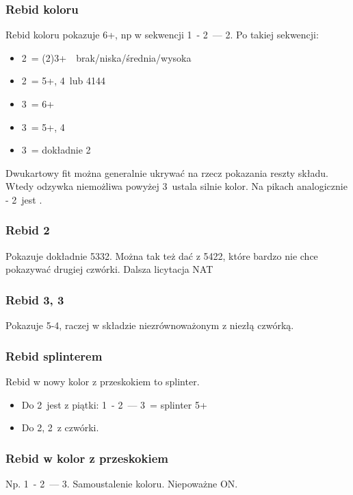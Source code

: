 \documentclass[12pt, a4paper]{article}
\begin{document}
\subsubsection*{Rebid koloru}
    Rebid koloru pokazuje 6+, np w sekwencji 1\hearts\ - 2\clubs\ --- 2\hearts.
    Po takiej sekwencji:
    \begin{itemize}
        \item 2\spades\ = (2)3+\hearts\ \lsf\ brak/niska/średnia/wysoka
        \item 2\nt\ = 5+\clubs, 4\spades\ lub 4144
        \item 3\clubs\ = 6+\clubs
        \item 3\diams\ = 5+\clubs, 4\diams
        \item 3\hearts\ = dokładnie 2\hearts\
    \end{itemize}
    Dwukartowy fit można generalnie ukrywać na rzecz pokazania reszty składu. Wtedy odzywka niemożliwa powyżej
    3\nt\ ustala silnie kolor.
    Na pikach analogicznie - 2\nt\ jest \lsf.

\subsubsection*{Rebid 2\ntx}
    Pokazuje dokładnie 5332. Można tak też dać z 5422, które bardzo nie chce pokazywać drugiej czwórki.
    Dalsza licytacja NAT

\subsubsection*{Rebid 3\clubs, 3\diams}
    Pokazuje 5-4, raczej w składzie niezrównoważonym z niezłą czwórką.

\subsubsection*{Rebid splinterem}
    Rebid w nowy kolor z przeskokiem to splinter.
    \begin{itemize}
        \item Do 2\clubs\ jest z piątki: 1\spades\ - 2\clubs\ --- 3\diams\ = splinter 5+\clubs
        \item Do 2\diams, 2\hearts\ z czwórki.
    \end{itemize}

\subsubsection*{Rebid w kolor z przeskokiem}
    Np. 1\spades\ - 2\diams\ --- 3\spades. Samoustalenie koloru. Niepoważne ON.
\end{document}
